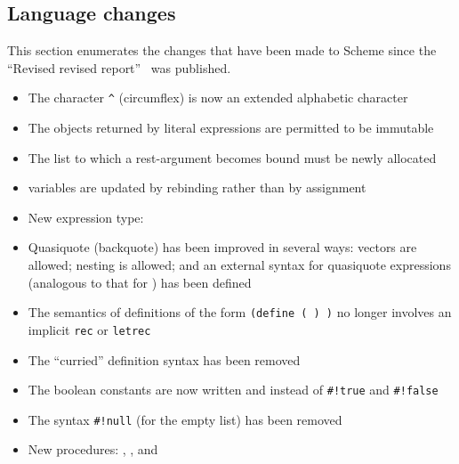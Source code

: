 


\subsection*{Language changes}
\label{differences}

This section enumerates the changes that have been made to Scheme since
the ``Revised revised report''~\cite{RRRS} was published.


\begin{itemize}
\item The character {\tt\verb"^"} (circumflex) is now an extended
alphabetic character

\item The objects returned by literal expressions are permitted to be
immutable

\item The list to which a rest-argument becomes bound must be newly allocated

\item {} variables are updated by rebinding rather than by
assignment

\item New expression type: 

\item Quasiquote (backquote) has been improved in several ways:
vectors are allowed; nesting is allowed; and an external syntax for
quasiquote expressions (analogous to that for ) has been
defined

\item The semantics of definitions of the form
{\tt(define ( ) )}
no longer involves an implicit {\tt rec} or {\tt letrec}

\item The ``curried'' definition syntax has been removed

\item The boolean constants are now written \schtrue{} and \schfalse{}
instead of {\tt\#!true} and {\tt\#!false}

\item The syntax {\tt\#!null} (for the empty list) has
been removed

\item New procedures: , , and 


\end{itemize}
